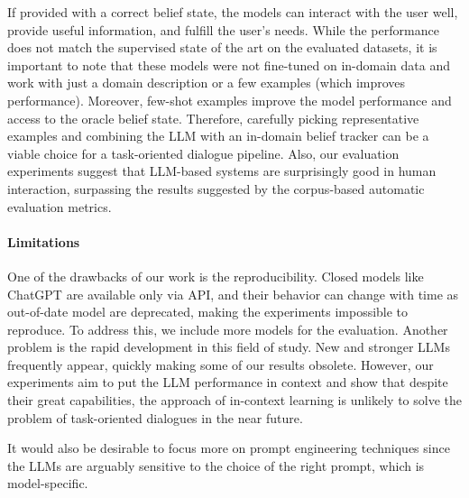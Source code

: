 If provided with a correct belief state, the models can interact with the user well, provide useful information, and fulfill the user's needs.
While the performance does not match the supervised state of the art on the evaluated datasets, it is important to note that these models were not fine-tuned on in-domain data and work with just a domain description or a few examples (which improves performance). 
Moreover, few-shot examples improve the model performance and access to the oracle belief state.
Therefore, carefully picking representative examples and combining the LLM with an in-domain belief tracker can be a viable choice for a task-oriented dialogue pipeline.
Also, our evaluation experiments suggest that LLM-based systems are surprisingly good in human interaction, surpassing the results suggested by the corpus-based automatic evaluation metrics.

\paragraph{Limitations}
One of the drawbacks of our work is the reproducibility.
Closed models like ChatGPT are available only via API, and their behavior can change with time as out-of-date model are deprecated, making the experiments impossible to reproduce.
To address this, we include more models for the evaluation.
Another problem is the rapid development in this field of study.
New and stronger LLMs frequently appear, quickly making some of our results obsolete.
However, our experiments aim to put the LLM performance in context and show that despite their great capabilities, the approach of in-context learning is unlikely to solve the problem of task-oriented dialogues in the near future.

It would also be desirable to focus more on prompt engineering techniques since the LLMs are arguably sensitive to the choice of the right prompt, which is model-specific.
